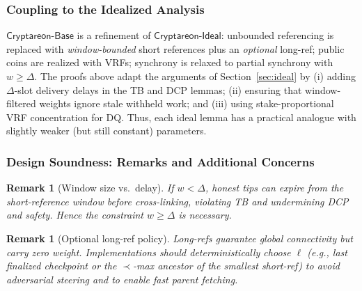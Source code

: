 \documentclass[11pt]{article}
\newtheorem{remark}[theorem]{Remark}
\newcommand{\ProjIdeal}{\ensuremath{\mathsf{Cryptareon\text{-}Ideal}}\xspace}
\newcommand{\ProjBase}{\ensuremath{\mathsf{Cryptareon\text{-}Base}}\xspace}
\newcommand{\id}{\ensuremath{\mathrm{id}}\xspace}
\begin{document}
\subsubsection{Coupling to the Idealized Analysis}
\label{subsec:base-coupling}
\ProjBase is a refinement of \ProjIdeal: unbounded referencing is replaced with \emph{window-bounded} short references plus an \emph{optional} long-ref; public coins are realized with VRFs; synchrony is relaxed to partial synchrony with $w\ge \Delta$. The proofs above adapt the arguments of Section~\ref{sec:ideal} by (i) adding $\Delta$-slot delivery delays in the TB and DCP lemmas; (ii) ensuring that window-filtered weights ignore stale withheld work; and (iii) using stake-proportional VRF concentration for DQ. Thus, each ideal lemma has a practical analogue with slightly weaker (but still constant) parameters.

\subsubsection{Design Soundness: Remarks and Additional Concerns}
\label{subsec:base-remarks}
\begin{remark}[Window size vs.\ delay]
If $w<\Delta$, honest tips can \emph{expire} from the short-reference window before cross-linking, violating TB and undermining DCP and safety. Hence the constraint $w\ge \Delta$ is \emph{necessary}.
\end{remark}

\begin{remark}[Optional long-ref policy]
Long-refs guarantee global connectivity but carry zero weight. Implementations should \emph{deterministically} choose $\ell$ (e.g., last finalized checkpoint or the $\prec$-max ancestor of the smallest short-ref) to avoid adversarial steering and to enable fast parent fetching.
\end{remark}

\end{document}
